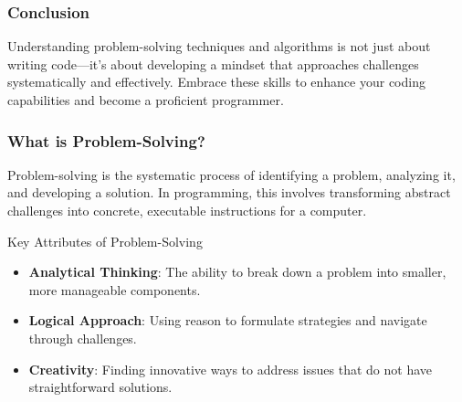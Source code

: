 \documentclass{beamer}
\begin{document}
\begin{frame}[fragile]
    \frametitle{Conclusion}
    Understanding problem-solving techniques and algorithms is not just about writing code—it's about developing a mindset that approaches challenges systematically and effectively. Embrace these skills to enhance your coding capabilities and become a proficient programmer.
\end{frame}

\begin{frame}[fragile]
    \frametitle{What is Problem-Solving?}
    Problem-solving is the systematic process of identifying a problem, analyzing it, and developing a solution. In programming, this involves transforming abstract challenges into concrete, executable instructions for a computer.

    \begin{block}{Key Attributes of Problem-Solving}
        \begin{itemize}
            \item \textbf{Analytical Thinking}: The ability to break down a problem into smaller, more manageable components.
            \item \textbf{Logical Approach}: Using reason to formulate strategies and navigate through challenges.
            \item \textbf{Creativity}: Finding innovative ways to address issues that do not have straightforward solutions.
        \end{itemize}
    \end{block}
\end{frame}
\end{document}
